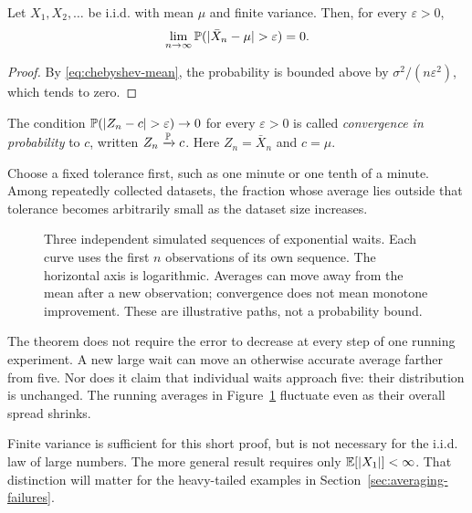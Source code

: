 \begin{theorem}
Let \(X_1,X_2,\ldots\) be i.i.d. with mean \(\mu\) and finite
variance. Then, for every \(\varepsilon>0\),
\begin{equation}
  \lim_{n\to\infty}\Prob(|\bar X_n-\mu|>\varepsilon)=0.
  \label{eq:weak-lln}
\end{equation}
\end{theorem}
\begin{proof}
By \eqref{eq:chebyshev-mean}, the probability is bounded above by
\(\sigma^2/(n\varepsilon^2)\), which tends to zero.
\end{proof}

\begin{definition}
The condition \(\Prob(|Z_n-c|>\varepsilon)\to0\) for every
\(\varepsilon>0\) is called \emph{convergence in probability} to \(c\),
written \(Z_n\xrightarrow{\mathbb{P}}c\). Here \(Z_n=\bar X_n\) and \(c=\mu\).
\end{definition}
Choose a fixed tolerance first,
such as one minute or one tenth of a minute. Among repeatedly collected
datasets, the fraction whose average lies outside that tolerance becomes
arbitrarily small as the dataset size increases.

\begin{figure}[H]
  \centering
  
  \caption{Three independent simulated sequences of exponential waits.
  Each curve uses the first \(n\) observations of its own sequence.
  The horizontal axis is logarithmic. Averages can move away from the
  mean after a new observation; convergence does not mean monotone
  improvement. These are illustrative paths, not a probability bound.}
  \label{fig:ch4-running}
\end{figure}

The theorem does not require the error to decrease at every step of
one running experiment. A new large wait can move an otherwise accurate
average farther from five. Nor does it claim that individual waits
approach five: their distribution is unchanged. The running averages
in Figure~\ref{fig:ch4-running} fluctuate even as their overall spread
shrinks.

Finite variance is sufficient for this short proof, but is not necessary
for the i.i.d. law of large numbers. The more general result requires
only \(\mathbb{E}[|X_1|]<\infty\). That distinction will matter for the
heavy-tailed examples in Section~\ref{sec:averaging-failures}.


